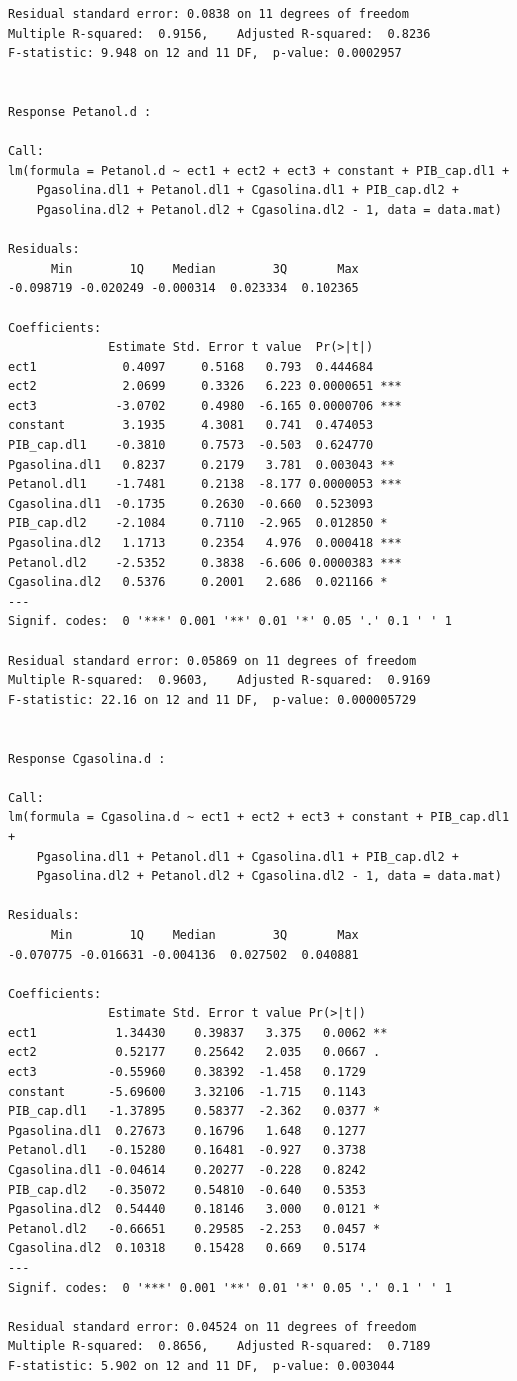 \documentclass[
  letterpaper,
  DIV=11,
  numbers=noendperiod]{scrartcl}
\begin{document}
\begin{verbatim}
Residual standard error: 0.0838 on 11 degrees of freedom
Multiple R-squared:  0.9156,    Adjusted R-squared:  0.8236 
F-statistic: 9.948 on 12 and 11 DF,  p-value: 0.0002957


Response Petanol.d :

Call:
lm(formula = Petanol.d ~ ect1 + ect2 + ect3 + constant + PIB_cap.dl1 + 
    Pgasolina.dl1 + Petanol.dl1 + Cgasolina.dl1 + PIB_cap.dl2 + 
    Pgasolina.dl2 + Petanol.dl2 + Cgasolina.dl2 - 1, data = data.mat)

Residuals:
      Min        1Q    Median        3Q       Max 
-0.098719 -0.020249 -0.000314  0.023334  0.102365 

Coefficients:
              Estimate Std. Error t value  Pr(>|t|)    
ect1            0.4097     0.5168   0.793  0.444684    
ect2            2.0699     0.3326   6.223 0.0000651 ***
ect3           -3.0702     0.4980  -6.165 0.0000706 ***
constant        3.1935     4.3081   0.741  0.474053    
PIB_cap.dl1    -0.3810     0.7573  -0.503  0.624770    
Pgasolina.dl1   0.8237     0.2179   3.781  0.003043 ** 
Petanol.dl1    -1.7481     0.2138  -8.177 0.0000053 ***
Cgasolina.dl1  -0.1735     0.2630  -0.660  0.523093    
PIB_cap.dl2    -2.1084     0.7110  -2.965  0.012850 *  
Pgasolina.dl2   1.1713     0.2354   4.976  0.000418 ***
Petanol.dl2    -2.5352     0.3838  -6.606 0.0000383 ***
Cgasolina.dl2   0.5376     0.2001   2.686  0.021166 *  
---
Signif. codes:  0 '***' 0.001 '**' 0.01 '*' 0.05 '.' 0.1 ' ' 1

Residual standard error: 0.05869 on 11 degrees of freedom
Multiple R-squared:  0.9603,    Adjusted R-squared:  0.9169 
F-statistic: 22.16 on 12 and 11 DF,  p-value: 0.000005729


Response Cgasolina.d :

Call:
lm(formula = Cgasolina.d ~ ect1 + ect2 + ect3 + constant + PIB_cap.dl1 + 
    Pgasolina.dl1 + Petanol.dl1 + Cgasolina.dl1 + PIB_cap.dl2 + 
    Pgasolina.dl2 + Petanol.dl2 + Cgasolina.dl2 - 1, data = data.mat)

Residuals:
      Min        1Q    Median        3Q       Max 
-0.070775 -0.016631 -0.004136  0.027502  0.040881 

Coefficients:
              Estimate Std. Error t value Pr(>|t|)   
ect1           1.34430    0.39837   3.375   0.0062 **
ect2           0.52177    0.25642   2.035   0.0667 . 
ect3          -0.55960    0.38392  -1.458   0.1729   
constant      -5.69600    3.32106  -1.715   0.1143   
PIB_cap.dl1   -1.37895    0.58377  -2.362   0.0377 * 
Pgasolina.dl1  0.27673    0.16796   1.648   0.1277   
Petanol.dl1   -0.15280    0.16481  -0.927   0.3738   
Cgasolina.dl1 -0.04614    0.20277  -0.228   0.8242   
PIB_cap.dl2   -0.35072    0.54810  -0.640   0.5353   
Pgasolina.dl2  0.54440    0.18146   3.000   0.0121 * 
Petanol.dl2   -0.66651    0.29585  -2.253   0.0457 * 
Cgasolina.dl2  0.10318    0.15428   0.669   0.5174   
---
Signif. codes:  0 '***' 0.001 '**' 0.01 '*' 0.05 '.' 0.1 ' ' 1

Residual standard error: 0.04524 on 11 degrees of freedom
Multiple R-squared:  0.8656,    Adjusted R-squared:  0.7189 
F-statistic: 5.902 on 12 and 11 DF,  p-value: 0.003044
\end{verbatim}
\end{document}
